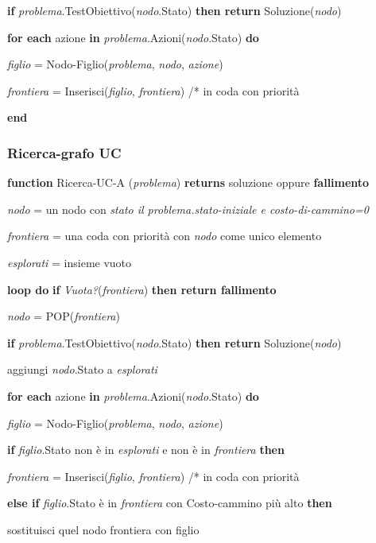 \quad \textbf{if} \textit{problema}.TestObiettivo(\textit{nodo}.Stato) \textbf{then return} Soluzione(\textit{nodo})

\quad \textbf{for each} azione \textbf{in} \textit{problema}.Azioni(\textit{nodo}.Stato) \textbf{do}

\quad \quad  \textit{figlio} = Nodo-Figlio(\textit{problema}, \textit{nodo}, \textit{azione})

\quad \quad  \textit{frontiera} = Inserisci(\textit{figlio}, \textit{frontiera}) /* in coda con priorità

\textbf{end}

\subsubsection{Ricerca-grafo UC}

\textbf{function} Ricerca-UC-A (\textit{problema}) \textbf{returns} soluzione oppure \textbf{fallimento}

\textit{nodo} = un nodo con \textit{stato il problema.stato-iniziale e costo-di-cammino=0}

\textit{frontiera} = una coda con priorità con \textit{nodo} come unico elemento

\textit{esplorati} = insieme vuoto

\textbf{loop do}
\quad \textbf{if} \textit{Vuota?}(\textit{frontiera}) \textbf{then return fallimento}

\quad \textit{nodo} = POP(\textit{frontiera})

\quad \textbf{if} \textit{problema}.TestObiettivo(\textit{nodo}.Stato) \textbf{then return} Soluzione(\textit{nodo})

\quad aggiungi \textit{nodo}.Stato a \textit{esplorati}

\quad \textbf{for each} azione \textbf{in} \textit{problema}.Azioni(\textit{nodo}.Stato) \textbf{do}

\quad \quad  \textit{figlio} = Nodo-Figlio(\textit{problema}, \textit{nodo}, \textit{azione})

\quad \quad \textbf{if} \textit{figlio}.Stato non è in \textit{esplorati} e non è in \textit{frontiera} \textbf{then}

\qquad \quad  \textit{frontiera} = Inserisci(\textit{figlio}, \textit{frontiera}) /* in coda con priorità

\quad \quad \textbf{else if} \textit{figlio}.Stato è in \textit{frontiera} con Costo-cammino più alto \textbf{then}

\qquad \quad sostituisci quel nodo frontiera con figlio

